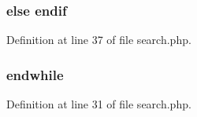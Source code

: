 \subsubsection[{endif}]{\setlength{\rightskip}{0pt plus 5cm}else endif}\label{search_8php_ab4d017bcc79cd2827c3dce8af2570e91}


Definition at line 37 of file search.\+php.

\hypertarget{search_8php_a1b05dae45f9e3f4c1fe86048550d2c5b}{}
\subsubsection[{endwhile}]{\setlength{\rightskip}{0pt plus 5cm}endwhile}\label{search_8php_a1b05dae45f9e3f4c1fe86048550d2c5b}


Definition at line 31 of file search.\+php.

